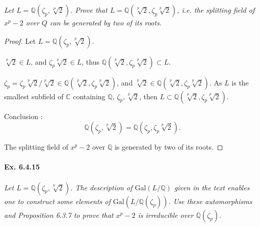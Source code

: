 \documentclass[11pt,a4paper]{article}
\newcommand{\Q}{\mathbb{Q}}
\newcommand{\C}{\mathbb{C}}
\newcommand{\Gal}{\mathrm{Gal}}
\begin{document}
{\it Let $L = \Q(\zeta_p,\sqrt[P]{2})$.  Prove that $L = \Q(\sqrt[p]{2}, \zeta_p \sqrt[p]{2})$, i.e. the splitting field of $x^p-2$ over $Q$ can be generated by two of its roots.
}

\begin{proof}
Let $L = \Q(\zeta_p, \sqrt[p]{2})$.

$\sqrt[p]{2} \in L$, and $\zeta_p \sqrt[p]{2} \in L$, thus $\Q(\sqrt[p]{2},\zeta_p \sqrt[p]{2}) \subset L$.

$\zeta_p = \zeta_p \sqrt[p]{2}/\sqrt[p]{2} \in \Q(\sqrt[p]{2},\zeta_p \sqrt[p]{2})$, and $\sqrt[p]{2} \in \Q(\sqrt[p]{2},\zeta_p \sqrt[p]{2})$.
As $L$ is the smallest subfield of $\C$ containing $\Q$, $\zeta_p, \sqrt[p]{2} $, then  $L \subset \Q(\sqrt[p]{2},\zeta_p \sqrt[p]{2})$.

Conclusion : $$\Q(\zeta_p, \sqrt[p]{2}) = \Q(\zeta_p, \zeta_p\sqrt[p]{2}).$$

The splitting field of $x^p-2$ over $\Q$ is generated by two of its roots.
\end{proof}

\paragraph{Ex. 6.4.15}

{\it Let $L = \Q(\zeta_p,\sqrt[p]{2})$. The description of $\Gal(L/\Q)$ given in the text enables one to construct some elements of $\Gal(L/\Q(\zeta_p))$. Use these automorphisms and Proposition 6.3.7 to prove that $x^p - 2 $ is irreducible over $\Q(\zeta_p)$.
}
\end{document}
